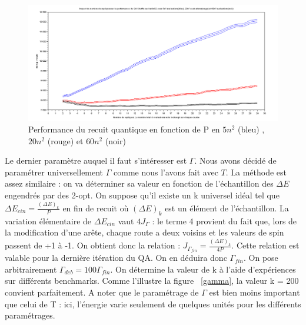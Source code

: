 \documentclass{article}%
\begin{document}
	\begin{figure}[!h]
	\begin{center}
	\includegraphics[scale=0.25]{berlin52_nbRepliques.png}
	\caption{Performance du recuit quantique en fonction de P en $ 5n^2 $ (bleu) , $ 20n^2 $ (rouge) et $ 60n^2 $ (noir)}
	\label{berlin52_nbRepliques}
	\end{center}
	\end{figure}
	
	\vspace{1cm}
	
	Le dernier paramètre auquel il faut s'intéresser est $ \Gamma $. Nous avons décidé de paramétrer universellement $ \Gamma $ comme nous l'avons fait avec $ T $. La méthode est assez similaire : on va déterminer sa valeur en fonction de l'échantillon des $ \Delta E $ engendrés par des 2-opt. On suppose qu'il existe un k universel idéal tel que $ \Delta E_{cin} = \frac{(\Delta E)_{k}}{P} $ en fin de recuit où $ (\Delta E)_{k} $ est un élément de l'échantillon. La variation élémentaire de $ \Delta E_{cin} $ vaut $ 4J_{\Gamma} $ : le terme 4 provient du fait que, lors de la modification d'une arête, chaque route a deux voisins et les valeurs de spin passent de +1 à -1. On obtient donc la relation : $ J_{\Gamma_{fin}} = \frac{(\Delta E)_{k}}{4P} $. Cette relation est valable pour la dernière itération du QA. On en déduira donc $ \Gamma_{fin} $. On pose arbitrairement $ \Gamma_{deb} = 100\Gamma_{fin} $. 
	On détermine la valeur de k à l'aide d'expériences sur différents benchmarks. Comme l'illustre la figure ~\ref{gamma}, la valeur k = 200 convient parfaitement. A noter que le paramétrage de $ \Gamma $ est bien moins important que celui de T : ici, l'énergie varie seulement de quelques unités pour les différents paramétrages.
	
\end{document}
